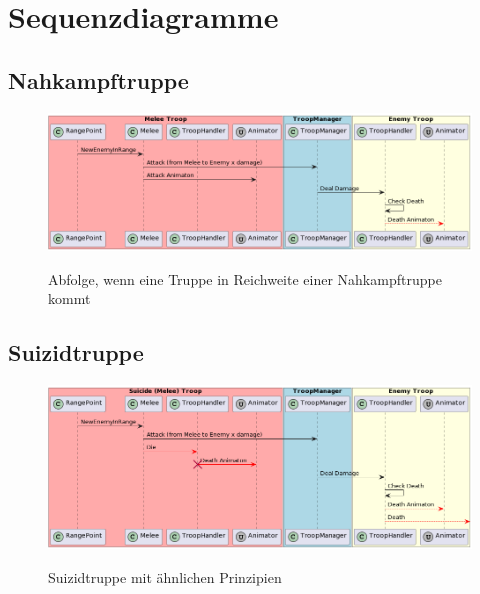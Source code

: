\section{Sequenzdiagramme}
\subsection{Nahkampftruppe}
\begin{figure}[H]
    \centering
    \includegraphics[width=15cm]{resources/MeleeAttacks.png}\\
    \caption{Abfolge, wenn eine Truppe in Reichweite einer Nahkampftruppe kommt}
\end{figure}

\subsection{Suizidtruppe}
\begin{figure}[H]
    \centering
    \includegraphics[width=15cm]{resources/SuicideAttacks.png}\\
    \caption{Suizidtruppe mit ähnlichen Prinzipien}
\end{figure}



